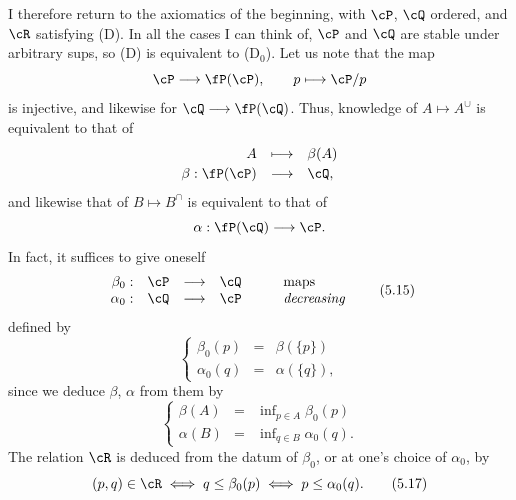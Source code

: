 I therefore return to the axiomatics of the beginning, with $\cP$, $\cQ$ ordered, and $\cR$ satisfying (D). In all the cases I can think of, $\cP$ and $\cQ$ are stable under arbitrary sups, so (D) is equivalent to (D$_0$). Let us note that the map
\[
\cP \longrightarrow \fP(\cP), \qquad p \longmapsto \cP/p
\]
is injective, and likewise for $\cQ \longrightarrow \fP(\cQ)$. Thus, knowledge of $A \longmapsto A^{\cup}$ is equivalent to that of %
\[
\begin{array}{rcl}
A & \longmapsto & \beta(A)\\[0.5ex]
\beta : \fP(\cP) & \longrightarrow & \cQ,
\end{array}
\]
and likewise that of $B \longmapsto B^{\cap}$ is equivalent to
that of
\[
\alpha : \fP(\cQ) \longrightarrow \cP.
\]
In fact, it suffices to give oneself
\[
\begin{array}{rcccl}
\beta_0 : & \cP & \longrightarrow & \cQ & \qquad \text{maps}\\
\alpha_0 : & \cQ & \longrightarrow & \cP & \qquad \textit{decreasing}
\end{array}
\tag*{(5.15)}
\]
defined by
\[
\left\{
\begin{array}{rcl}
\beta_0(p) & = & \beta(\{p\})\\[1ex]
\alpha_0(q) & = & \alpha(\{q\}),
\end{array}
\right.
\]
since we deduce $\beta$, $\alpha$ from them by
\[
\left\{
\begin{array}{rcl}
\beta(A) & = & \inf\nolimits_{p \in A} \beta_0(p)\\[1ex]
\alpha(B) & = & \inf\nolimits_{q \in B} \alpha_0(q).
\end{array}
\right.
\tag*{(5.16)}
\]
The relation $\cR$ is deduced from the datum of $\beta_0$, or at one's choice of $\alpha_0$, by
\[
(p,q) \in \cR \iff q \leq \beta_0(p) \iff p \leq \alpha_0(q).
\tag*{(5.17)}
\]


